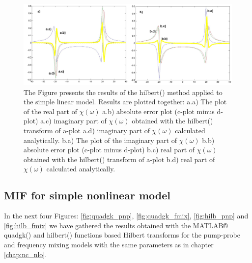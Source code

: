 \documentclass[12pt,twoside,a4paper]{article}
\numberwithin{equation}{subsection}
\numberwithin{figure}{subsection}
\begin{document}
\begin{figure} 
  \includegraphics[width=150mm]{img/hilb_lin.png}
  \caption{The Figure presents the results of the hilbert() method applied to the simple linear model. Results are plotted together:
   a.a) The plot of the real part of $\chi (\omega )$ 
   a.b) absolute error plot (c-plot minus d-plot) 
   a.c) imaginary part of $\chi (\omega )$ obtained with the hilbert() transform of a-plot 
   a.d) imaginary part of $\chi (\omega )$  calculated analytically. 
   b.a) The plot of the imaginary part of $\chi (\omega )$ 
   b.b) absolute error plot (c-plot minus d-plot) 
   b.c) real part of $\chi (\omega )$ obtained with the hilbert() transform of a-plot 
   b.d) real part of $\chi (\omega )$ calculated analytically. \label{fig:hilb_lin}
  }
\end{figure}

\subsection{MIF for simple nonlinear model} \label{chap:matlab_nlo}

In the next four Figures: \ref{fig:quadgk_pnp}, \ref{fig:quadgk_fmix}, \ref{fig:hilb_pnp} and \ref{fig:hilb_fmix} we have gathered
the results obtained with the MATLAB® quadgk() and hilbert() functions based Hilbert transforms for the pump-probe and frequency
mixing models with the same parameters as in chapter \ref{chap:nc_nlo}. 
\end{document}
